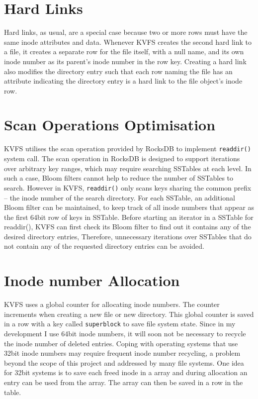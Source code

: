 \documentclass[bsc,frontabs,twoside,singlespacing,parskip,deptreport]{infthesis}     %
\begin{document}
\section{Hard Links}
Hard links, as usual, are a special case because two or more rows must have the same inode attributes and data. Whenever KVFS creates the second hard link to a file, it creates a separate row for the file itself, with a null name, and its own inode number as its parent's inode number in the row key. Creating a hard link also modifies the directory entry such that each row naming the file has an attribute indicating the directory entry is a hard link to the file object's inode row.

\section{Scan Operations Optimisation}
KVFS utilises the scan operation provided by RocksDB to implement {\tt readdir()} system call. The scan operation in RocksDB is designed to support iterations over arbitrary key ranges, which may require searching SSTables at each level. In such a case, Bloom filters cannot help to reduce the number of SSTables to search. However in KVFS, {\tt readdir()} only scans keys sharing the common prefix -- the inode number of the search directory. For each SSTable, an additional Bloom filter can be maintained, to keep track of all inode numbers that appear as the first 64bit row of keys in SSTable. Before starting an iterator in a SSTable for readdir(), KVFS can first check its Bloom filter to find out it contains any of the desired directory entries, Therefore, unnecessary iterations over SSTables that do not contain any of the requested directory entries can be avoided.

\section{Inode number Allocation}
KVFS uses a global counter for allocating inode numbers. The counter increments when creating a new file or new directory. This global counter is saved in a row with a key called {\tt superblock} to save file system state. Since in my development I use 64bit inode numbers, it will soon not be necessary to recycle the inode number of deleted entries. Coping with operating systems that use 32bit inode numbers may require frequent inode number recycling, a problem beyond the scope of this project and addressed by many file systems. One idea for 32bit systems is to save each freed inode in a array and during allocation an entry can be used from the array. The array can then be saved in a row in the table.
\end{document}
